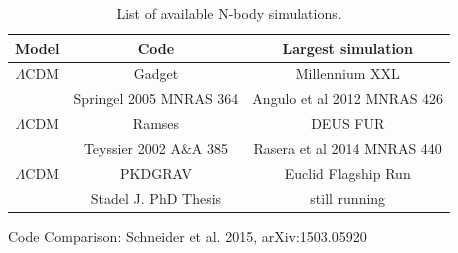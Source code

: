 \begin{table}[h!]
\begin{center}
\begin{tabular}{|c|c|c|}
\hline
Model        & Code                     & Largest simulation\\
\hline
$\Lambda$CDM & Gadget                   & Millennium XXL \\
             & Springel 2005 MNRAS 364  & Angulo et al 2012 MNRAS 426\\
\hline
$\Lambda$CDM & Ramses                   & DEUS FUR \\
             & Teyssier 2002 A$\&$A 385 & Rasera et al 2014 MNRAS 440\\
\hline
$\Lambda$CDM & PKDGRAV                  & Euclid Flagship Run \\
             & Stadel J. PhD Thesis     & still running\\
\hline
\end{tabular}
\caption{List of available N-body simulations.}
\end{center}
\end{table}

Code Comparison: Schneider et al. 2015, arXiv:1503.05920



%



